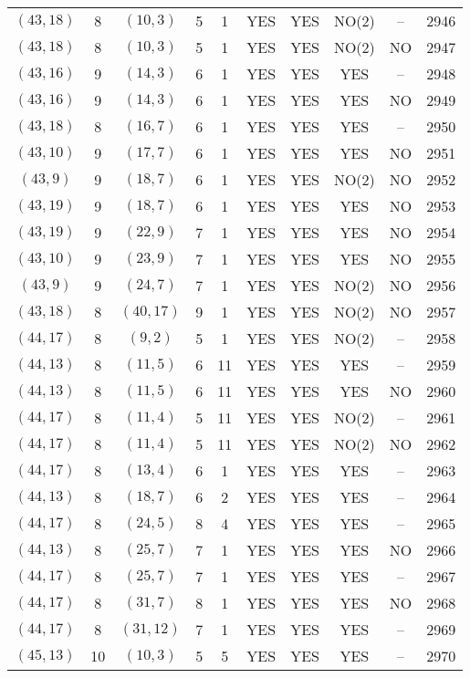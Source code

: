 \begin{longtable}{|c|c|c|c|c|c|c|c|c|c|}
$(43, 18)$ & 8 & $(10, 3)$ & 5 & 1 & YES & YES & NO(2) & -- & 2946\\
$(43, 18)$ & 8 & $(10, 3)$ & 5 & 1 & YES & YES & NO(2) & NO & 2947\\
$(43, 16)$ & 9 & $(14, 3)$ & 6 & 1 & YES & YES & YES & -- & 2948\\
$(43, 16)$ & 9 & $(14, 3)$ & 6 & 1 & YES & YES & YES & NO & 2949\\
$(43, 18)$ & 8 & $(16, 7)$ & 6 & 1 & YES & YES & YES & -- & 2950\\
$(43, 10)$ & 9 & $(17, 7)$ & 6 & 1 & YES & YES & YES & NO & 2951\\
$(43, 9)$ & 9 & $(18, 7)$ & 6 & 1 & YES & YES & NO(2) & NO & 2952\\
$(43, 19)$ & 9 & $(18, 7)$ & 6 & 1 & YES & YES & YES & NO & 2953\\
$(43, 19)$ & 9 & $(22, 9)$ & 7 & 1 & YES & YES & YES & NO & 2954\\
$(43, 10)$ & 9 & $(23, 9)$ & 7 & 1 & YES & YES & YES & NO & 2955\\
$(43, 9)$ & 9 & $(24, 7)$ & 7 & 1 & YES & YES & NO(2) & NO & 2956\\
$(43, 18)$ & 8 & $(40, 17)$ & 9 & 1 & YES & YES & NO(2) & NO & 2957\\
$(44, 17)$ & 8 & $(9, 2)$ & 5 & 1 & YES & YES & NO(2) & -- & 2958\\
$(44, 13)$ & 8 & $(11, 5)$ & 6 & 11 & YES & YES & YES & -- & 2959\\
$(44, 13)$ & 8 & $(11, 5)$ & 6 & 11 & YES & YES & YES & NO & 2960\\
$(44, 17)$ & 8 & $(11, 4)$ & 5 & 11 & YES & YES & NO(2) & -- & 2961\\
$(44, 17)$ & 8 & $(11, 4)$ & 5 & 11 & YES & YES & NO(2) & NO & 2962\\
$(44, 17)$ & 8 & $(13, 4)$ & 6 & 1 & YES & YES & YES & -- & 2963\\
$(44, 13)$ & 8 & $(18, 7)$ & 6 & 2 & YES & YES & YES & -- & 2964\\
$(44, 17)$ & 8 & $(24, 5)$ & 8 & 4 & YES & YES & YES & -- & 2965\\
$(44, 13)$ & 8 & $(25, 7)$ & 7 & 1 & YES & YES & YES & NO & 2966\\
$(44, 17)$ & 8 & $(25, 7)$ & 7 & 1 & YES & YES & YES & -- & 2967\\
$(44, 17)$ & 8 & $(31, 7)$ & 8 & 1 & YES & YES & YES & NO & 2968\\
$(44, 17)$ & 8 & $(31, 12)$ & 7 & 1 & YES & YES & YES & -- & 2969\\
$(45, 13)$ & 10 & $(10, 3)$ & 5 & 5 & YES & YES & YES & -- & 2970\\

\end{longtable}
